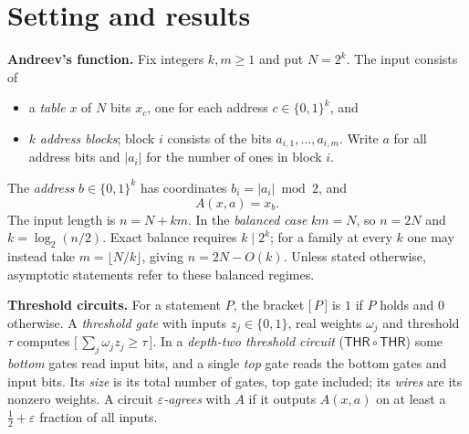 \documentclass[11pt,letterpaper]{article}
\theoremstyle{remark}
\newcommand{\bits}{\{0,1\}}
\newcommand{\ind}[1]{\bigl[\,#1\,\bigr]}
\newcommand{\sect}[1]{\section{\texorpdfstring{\color{ink}#1}{#1}}}
\newcommand{\smalltitle}[1]{\textbf{\color{ink}#1}\quad}
\newcommand{\THR}{\mathsf{THR}}
\begin{document}
\sect{Setting and results}

\smalltitle{Andreev's function.}
Fix integers $k,m\ge1$ and put $N=2^k$. The input consists of
\begin{itemize}
\item a \emph{table} $x$ of $N$ bits $x_c$, one for each address
      $c\in\bits^k$, and
\item $k$ \emph{address blocks}; block $i$ consists of the bits
      $a_{i,1},\dots,a_{i,m}$. Write $a$ for all address bits and
      $|a_i|$ for the number of ones in block $i$.
\end{itemize}
The \emph{address} $b\in\bits^k$ has coordinates $b_i=|a_i|\bmod2$, and
\[
A(x,a)=x_b .
\]
The input length is $n=N+km$. In the \emph{balanced case} $km=N$, so $n=2N$
and $k=\log_2(n/2)$. Exact balance requires $k\mid2^k$; for a family at
every $k$ one may instead take $m=\lfloor N/k\rfloor$, giving $n=2N-O(k)$.
Unless stated otherwise, asymptotic statements refer to these balanced regimes.

\smalltitle{Threshold circuits.}
For a statement $P$, the bracket $\ind{P}$ is $1$ if $P$ holds and $0$
otherwise. A \emph{threshold gate} with inputs $z_j\in\bits$, real weights
$\omega_j$ and threshold $\tau$ computes $\ind{\sum_j\omega_jz_j\ge\tau}$. In a \emph{depth-two threshold
circuit} ($\THR\circ\THR$) some \emph{bottom} gates read input bits, and a
single \emph{top} gate reads the bottom gates and input bits. Its
\emph{size} is its total number of gates, top gate included; its
\emph{wires} are its nonzero weights. A circuit
\emph{$\varepsilon$-agrees} with $A$ if it outputs $A(x,a)$ on at least a
$\tfrac12+\varepsilon$ fraction of all inputs.
\end{document}
